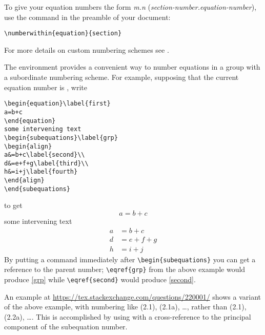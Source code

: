 To give your equation numbers the form \textit{m.n}
(\textit{section-number.equation-number}), use the 
command in the preamble of your document:
\begin{verbatim}
\numberwithin{equation}{section}
\end{verbatim}
For more details on custom numbering schemes see \cite[\S 6.3,
\S C.8.4]{lamport}.

The  environment provides a convenient way to number
equations in a group with a subordinate numbering scheme. For example,
supposing that the current equation number is \theequation, write
\begin{verbatim}
\begin{equation}\label{first}
a=b+c
\end{equation}
some intervening text
\begin{subequations}\label{grp}
\begin{align}
a&=b+c\label{second}\\
d&=e+f+g\label{third}\\
h&=i+j\label{fourth}
\end{align}
\end{subequations}
\end{verbatim}
to get
\begin{equation}\label{first}
a=b+c
\end{equation}
some intervening text
\begin{subequations}\label{grp}
\begin{align}
a&=b+c\label{second}\\
d&=e+f+g\label{third}\\
h&=i+j\label{fourth}
\end{align}
\end{subequations}
By putting a  command immediately after
\verb'\begin{subequations}' you can get a reference to the parent
  number; \verb'\eqref{grp}' from the above example would produce \eqref{grp}
  while \verb'\eqref{second}' would produce \eqref{second}.

An example at \url{https://tex.stackexchange.com/questions/220001/} shows
a variant of the above example, with numbering like (2.1), (2.1a),
\dots, rather than (2.1), (2.2a), \dots.  This is accomplished by using
 with a cross-reference to the principal component of the
subequation number.

\newpage


